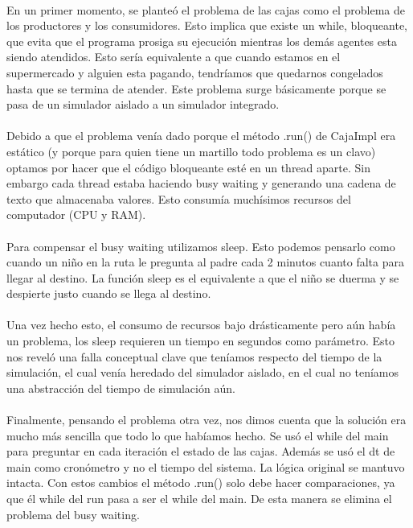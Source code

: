 \documentclass{article}
\begin{document}
\paragraph{}
En un primer momento, se planteó el problema de las cajas como el problema de los productores y los consumidores. Esto implica que existe un while, bloqueante, que evita que el programa prosiga su ejecución mientras los demás agentes esta siendo atendidos. Esto sería equivalente a que cuando estamos en el supermercado y alguien esta pagando, tendríamos que quedarnos congelados hasta que se termina de atender. Este problema surge básicamente porque se pasa de un simulador aislado a un simulador integrado.

\paragraph{}
Debido a que el problema venía dado porque el método .run() de CajaImpl era estático (y porque para quien tiene un martillo todo problema es un clavo) optamos por hacer que el código bloqueante esté en un thread aparte. Sin embargo cada thread estaba haciendo busy waiting y generando una cadena de texto que almacenaba valores. Esto consumía muchísimos recursos del computador (CPU y RAM).

\paragraph{}
Para compensar el busy waiting utilizamos sleep. Esto podemos pensarlo como cuando un niño en la ruta le pregunta al padre cada 2 minutos cuanto falta para llegar al destino. La función sleep es el equivalente a que el niño se duerma y se despierte justo cuando se llega al destino.

\paragraph{}
Una vez hecho esto, el consumo de recursos bajo drásticamente pero aún había un problema, los sleep requieren un tiempo en segundos como parámetro. Esto nos reveló una falla conceptual clave que teníamos respecto del tiempo de la simulación, el cual venía heredado del simulador aislado, en el cual no teníamos una abstracción del tiempo de simulación aún.

\paragraph{}
Finalmente, pensando el problema otra vez, nos dimos cuenta que la solución era mucho más sencilla que todo lo que habíamos hecho. Se usó el while del main para preguntar en cada iteración el estado de las cajas. Además se usó el dt de main como cronómetro y no el tiempo del sistema. La lógica original se mantuvo intacta. Con estos cambios el método .run() solo debe hacer comparaciones, ya que él while del run pasa a ser el while del main. De esta manera se elimina el problema del busy waiting.
\end{document}
